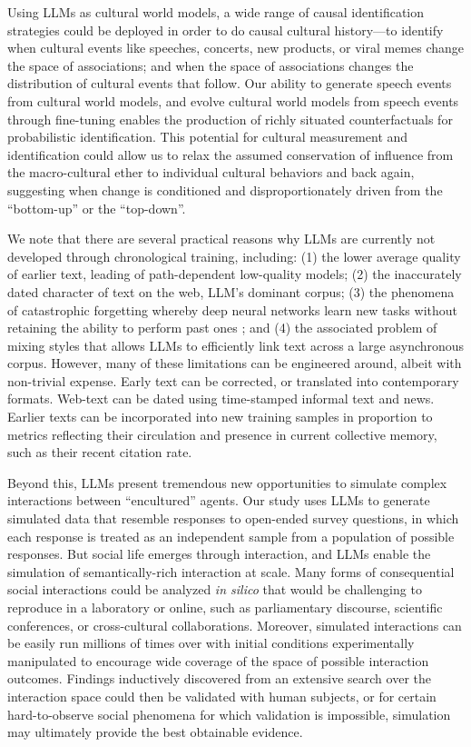 \documentclass{article}
\begin{document}
Using LLMs as cultural world models, a wide range of causal
identification strategies
\parencite{Pearl2009-on} could be
deployed in order to do causal cultural history---to identify when
cultural events like speeches, concerts, new products, or viral memes
change the space of associations; and when the space of associations
changes the distribution of cultural events that follow. Our ability to
generate speech events from cultural world models, and evolve cultural
world models from speech events through fine-tuning enables the
production of richly situated counterfactuals for probabilistic
identification. This potential for cultural measurement and
identification could allow us to relax the assumed conservation of
influence from the macro-cultural ether to individual cultural behaviors
and back again, suggesting when change is conditioned and
disproportionately driven from the ``bottom-up'' or the ``top-down''.

We note that there are several practical reasons why LLMs are currently
not developed through chronological training, including: (1) the lower
average quality of earlier text, leading of path-dependent low-quality
models; (2) the inaccurately dated character of text on the web, LLM's
dominant corpus; (3) the phenomena of catastrophic forgetting whereby
deep neural networks learn new tasks without retaining the ability to
perform past ones
\parencite{McCloskey1989-rg, Ratcliff1990-bk}; and (4) the associated problem of mixing styles
that allows LLMs to efficiently link text across a large asynchronous
corpus. However, many of these limitations can be engineered around,
albeit with non-trivial expense. Early text can be corrected, or
translated into contemporary formats. Web-text can be dated using
time-stamped informal text and news. Earlier texts can be incorporated
into new training samples in proportion to metrics reflecting their
circulation and presence in current collective memory, such as their
recent citation rate.

Beyond this, LLMs present tremendous new opportunities to simulate
complex interactions between ``encultured'' agents. Our study uses LLMs
to generate simulated data that resemble responses to open-ended survey
questions, in which each response is treated as an independent sample
from a population of possible responses. But social life emerges through
interaction, and LLMs enable the simulation of semantically-rich
interaction at scale. Many forms of consequential social interactions
could be analyzed \emph{in silico} that would be challenging to
reproduce in a laboratory or online, such as parliamentary discourse,
scientific conferences, or cross-cultural collaborations. Moreover,
simulated interactions can be easily run millions of times over with
initial conditions experimentally manipulated to encourage wide coverage
of the space of possible interaction outcomes. Findings inductively
discovered from an extensive search over the interaction space could
then be validated with human subjects, or for certain hard-to-observe
social phenomena for which validation is impossible, simulation may
ultimately provide the best obtainable evidence.
\end{document}
